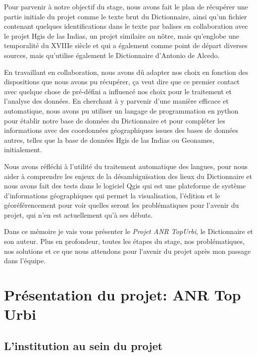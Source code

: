 \documentclass[a4paper,12pt,twoside]{book}
\begin{document}
Pour parvenir à notre objectif du stage, nous avons fait le plan de récupérer une partie initiale du projet comme le texte brut du Dictionnaire, ainsi qu’un fichier contenant quelques identifications dans le texte par balises en collaboration avec le projet Hgis de las Indias, un projet similaire au nôtre, mais qu’englobe une temporalité du XVIIIe siècle et qui a également comme point de départ diverses sources, mais qu’utilise également le Dictionnaire d’Antonio de Alcedo.
	
En travaillant en collaboration, nous avons dû adapter nos choix en fonction des dispositions que nous avons pu récupérer, ça veut dire que ce premier contact avec quelque chose de pré-défini a influencé nos choix pour le traitement et l’analyse des données. En cherchant à y parvenir d’une manière efficace et automatique, nous avons pu utiliser un langage de programmation en python pour établir notre base de données du Dictionnaire et pour compléter les informations avec des coordonnées géographiques issues des bases de données autres, telles que la base de données Hgis de las Indias ou Geonames, initialement. 

Nous avons réfléchi à l’utilité du traitement automatique des langues, pour nous aider à comprendre les enjeux de la désambiguïsation des lieux du Dictionnaire et nous avons fait des tests dans le logiciel Qgis qui est une plateforme de système d’informations géographiques qui permet la visualisation, l’édition et le géoréférencement pour voir quelles seront les problématiques pour l’avenir du projet, qui n’en est actuellement qu’à ses débuts. 

Dans ce mémoire je vais vous présenter le \textit{Projet ANR TopUrbi}, le Dictionnaire et son auteur. Plus en profondeur, toutes les étapes du stage, nos problématiques, nos solutions et ce que nous attendons pour l’avenir du projet après mon passage dans l’équipe.
	
	\thispagestyle{empty}
\cleardoublepage
	
	\mainmatter
	
	\part{Présentation du projet: ANR Top Urbi}
	
	\chapter{L'institution au sein du projet}
\end{document}
